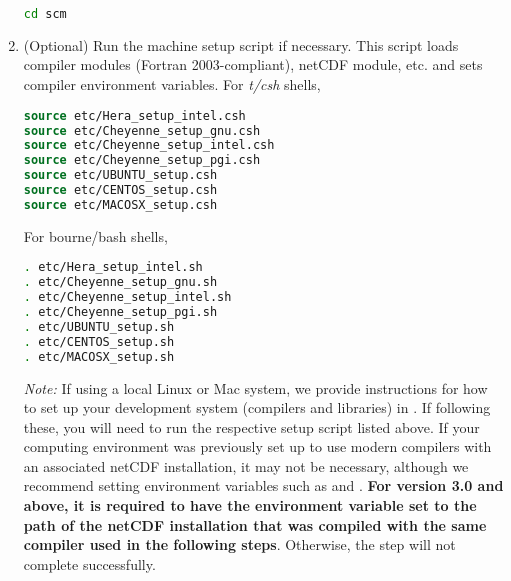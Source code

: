 \begin{enumerate}
\begin{lstlisting}[language=bash]
cd scm
\end{lstlisting}
    \item (Optional) Run the machine setup script if necessary. This script loads compiler modules (Fortran 2003-compliant), netCDF module, etc. and sets compiler environment variables. For \textit{t/csh} shells,
\begin{lstlisting}[language=csh]
source etc/Hera_setup_intel.csh
source etc/Cheyenne_setup_gnu.csh
source etc/Cheyenne_setup_intel.csh
source etc/Cheyenne_setup_pgi.csh
source etc/UBUNTU_setup.csh
source etc/CENTOS_setup.csh
source etc/MACOSX_setup.csh
\end{lstlisting}
For bourne/bash shells,
\begin{lstlisting}[language=bash]
. etc/Hera_setup_intel.sh
. etc/Cheyenne_setup_gnu.sh
. etc/Cheyenne_setup_intel.sh
. etc/Cheyenne_setup_pgi.sh
. etc/UBUNTU_setup.sh
. etc/CENTOS_setup.sh
. etc/MACOSX_setup.sh
\end{lstlisting}
\emph{Note:} If using a local Linux or Mac system, we provide instructions for how to set up your development system (compilers and libraries) in . If following these, you will need to run the respective setup script listed above. If your computing environment was previously set up to use modern compilers with an associated netCDF installation, it may not be necessary, although we recommend setting environment variables such as  and . \textbf{For version 3.0 and above, it is required to have the  environment variable set to the path of the netCDF installation that was compiled with the same compiler used in the following steps}. Otherwise, the  step will not complete successfully.


\end{enumerate}
